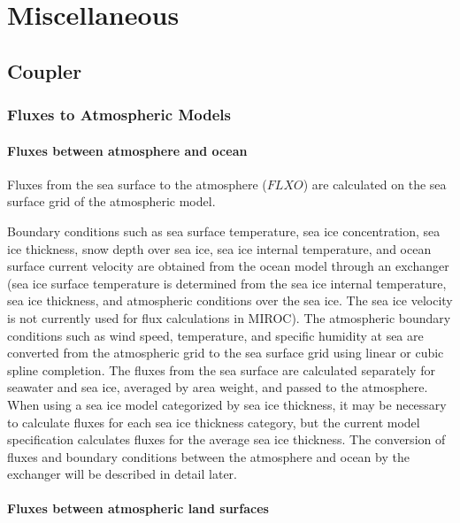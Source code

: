 \hypertarget{miscellaneous}{%
\section{Miscellaneous}\label{miscellaneous}}

\hypertarget{coupler}{%
\subsection{Coupler}\label{coupler}}

\hypertarget{fluxes-to-atmospheric-models}{%
\subsubsection{Fluxes to Atmospheric
Models}\label{fluxes-to-atmospheric-models}}

\hypertarget{fluxes-between-atmosphere-and-ocean}{%
\paragraph{Fluxes between atmosphere and
ocean}\label{fluxes-between-atmosphere-and-ocean}}

Fluxes from the sea surface to the atmosphere (\(FLXO\)) are calculated
on the sea surface grid of the atmospheric model.

Boundary conditions such as sea surface temperature, sea ice
concentration, sea ice thickness, snow depth over sea ice, sea ice
internal temperature, and ocean surface current velocity are obtained
from the ocean model through an exchanger (sea ice surface temperature
is determined from the sea ice internal temperature, sea ice thickness,
and atmospheric conditions over the sea ice. The sea ice velocity is not
currently used for flux calculations in MIROC). The atmospheric boundary
conditions such as wind speed, temperature, and specific humidity at sea
are converted from the atmospheric grid to the sea surface grid using
linear or cubic spline completion. The fluxes from the sea surface are
calculated separately for seawater and sea ice, averaged by area weight,
and passed to the atmosphere. When using a sea ice model categorized by
sea ice thickness, it may be necessary to calculate fluxes for each sea
ice thickness category, but the current model specification calculates
fluxes for the average sea ice thickness. The conversion of fluxes and
boundary conditions between the atmosphere and ocean by the exchanger
will be described in detail later.

\hypertarget{fluxes-between-atmospheric-land-surfaces}{%
\paragraph{Fluxes between atmospheric land
surfaces}\label{fluxes-between-atmospheric-land-surfaces}}

